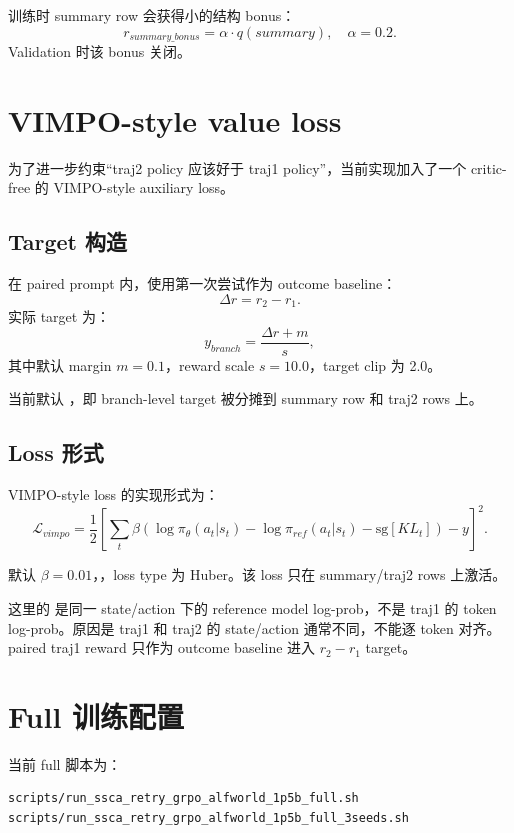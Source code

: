 \documentclass[10pt]{ctexart}
\begin{document}
训练时 summary row 会获得小的结构 bonus：
\begin{equation}
  r_{summary\_bonus} = \alpha \cdot q(summary), \quad \alpha=0.2.
\end{equation}
Validation 时该 bonus 关闭。

\section{VIMPO-style value loss}
为了进一步约束“traj2 policy 应该好于 traj1 policy”，当前实现加入了一个 critic-free 的 VIMPO-style auxiliary loss。

\subsection{Target 构造}
在 paired prompt 内，使用第一次尝试作为 outcome baseline：
\begin{equation}
  \Delta r = r_2 - r_1.
\end{equation}
实际 target 为：
\begin{equation}
  y_{branch} = \frac{\Delta r + m}{s},
\end{equation}
其中默认 margin $m=0.1$，reward scale $s=10.0$，target clip 为 2.0。

当前默认 ，即 branch-level target 被分摊到 summary row 和 traj2 rows 上。

\subsection{Loss 形式}
VIMPO-style loss 的实现形式为：
\begin{equation}
  \mathcal{L}_{vimpo}
  = \frac{1}{2}\left[\sum_t \beta \left(\log \pi_\theta(a_t|s_t) - \log \pi_{ref}(a_t|s_t) - \mathrm{sg}[KL_t]\right) - y\right]^2.
\end{equation}

默认 $\beta=0.01$，，loss type 为 Huber。该 loss 只在 summary/traj2 rows 上激活。

这里的  是同一 state/action 下的 reference model log-prob，不是 traj1 的 token log-prob。原因是 traj1 和 traj2 的 state/action 通常不同，不能逐 token 对齐。paired traj1 reward 只作为 outcome baseline 进入 $r_2-r_1$ target。

\section{Full 训练配置}
当前 full 脚本为：
\begin{lstlisting}
scripts/run_ssca_retry_grpo_alfworld_1p5b_full.sh
scripts/run_ssca_retry_grpo_alfworld_1p5b_full_3seeds.sh
\end{lstlisting}
\end{document}
